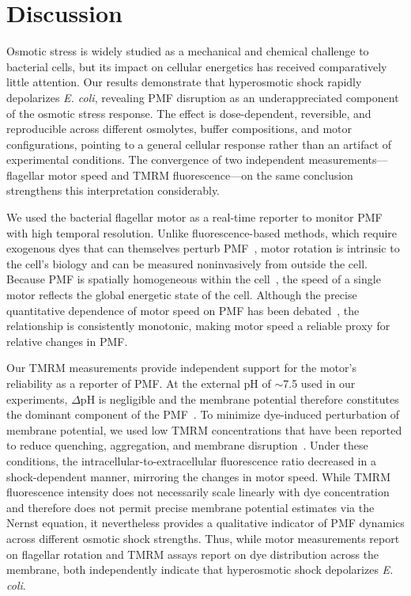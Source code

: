 \documentclass[twocolumn]{biophys-new}%
\begin{document}
\section*{Discussion}

Osmotic stress is widely studied as a mechanical and chemical challenge to bacterial cells, but its impact on cellular energetics has received comparatively little attention. Our results demonstrate that hyperosmotic shock rapidly depolarizes \textit{E. coli}, revealing PMF disruption as an underappreciated component of the osmotic stress response. The effect is dose-dependent, reversible, and reproducible across different osmolytes, buffer compositions, and motor configurations, pointing to a general cellular response rather than an artifact of experimental conditions. The convergence of two independent measurements---flagellar motor speed and TMRM fluorescence---on the same conclusion strengthens this interpretation considerably.

We used the bacterial flagellar motor as a real-time reporter to monitor PMF with high temporal resolution. Unlike fluorescence-based methods, which require exogenous dyes that can themselves perturb PMF~\cite{MANCINI20204l}, motor rotation is intrinsic to the cell's biology and can be measured noninvasively from outside the cell. Because PMF is spatially homogeneous within the cell~\cite{biquet2024spatiotemporal}, the speed of a single motor reflects the global energetic state of the cell. Although the precise quantitative dependence of motor speed on PMF has been debated~\cite{fung_berg1995,GABEL2003l,Krasnopeeva2024}, the relationship is consistently monotonic,  making motor speed a reliable proxy for relative changes in PMF.

Our TMRM measurements provide independent support for the motor’s reliability as a reporter of PMF. At the external pH of $\sim$7.5 used in our experiments, $\Delta \text{pH}$ is negligible and the membrane potential therefore constitutes the dominant component of the PMF~\cite{padan1976,slonczewski1981}. To minimize dye-induced perturbation of membrane potential, we used low TMRM concentrations that have been reported to reduce quenching, aggregation, and membrane disruption~\cite{LO2007etl,jinetal2023l}. Under these conditions, the intracellular-to-extracellular fluorescence ratio decreased in a shock-dependent manner, mirroring the changes in motor speed. While TMRM fluorescence intensity does not necessarily scale linearly with dye concentration and therefore does not permit precise membrane potential estimates via the Nernst equation, it nevertheless provides a qualitative indicator of PMF dynamics across different osmotic shock strengths. Thus, while motor measurements report on flagellar rotation and TMRM assays report on dye distribution across the membrane, both independently indicate that hyperosmotic shock depolarizes \textit{E. coli}.
\end{document}

